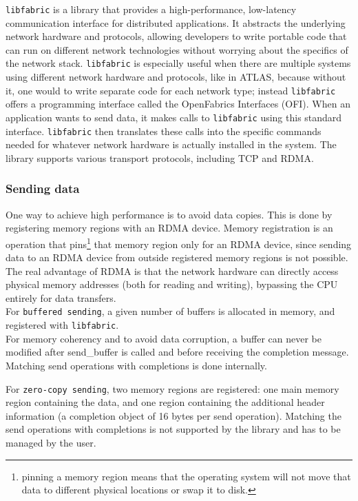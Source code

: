 \texttt{libfabric} \cite{libfabric} is a library that provides a high-performance, low-latency communication interface for distributed applications. It abstracts the underlying network hardware and protocols, allowing developers to write portable code that can run on different network technologies without worrying about the specifics of the network stack. \texttt{libfabric} is especially useful when there are multiple systems using different network hardware and protocols, like in \acs{ATLAS}, because without it, one would to write separate code for each network type; instead \texttt{libfabric} offers a programming interface called the OpenFabrics Interfaces (OFI). When an application wants to send data, it makes calls to \texttt{libfabric} using this standard interface. \texttt{libfabric} then translates these calls into the specific commands needed for whatever network hardware is actually installed in the system. The library supports various transport protocols, including TCP and \acs{RDMA}.

\subsubsection{Sending data}

One way to achieve high performance is to avoid data copies. This is done by registering memory regions with an \acs{RDMA} device. Memory registration is an operation that pins\footnote{pinning a memory region means that the operating system will not move that data to different physical locations or swap it to disk.} that memory region only for an \acs{RDMA} device, since sending data to an \acs{RDMA} device from outside registered memory regions is not possible. The real advantage of RDMA is that the network hardware can directly access physical memory addresses (both for reading and writing), bypassing the CPU entirely for data transfers.\\

For \texttt{buffered sending}, a given number of buffers is allocated in memory, and registered with \texttt{libfabric}.\\
For memory coherency and to avoid data corruption, a buffer can never be modified after send\_buffer is called and before receiving the completion message. Matching send operations with completions is done internally.

For \texttt{zero-copy sending}, two memory regions are registered: one main memory region containing the data, and one region containing the additional header information (a completion object of 16 bytes per send operation).  Matching the send operations with completions is not supported by the library and has to be managed by the user.

